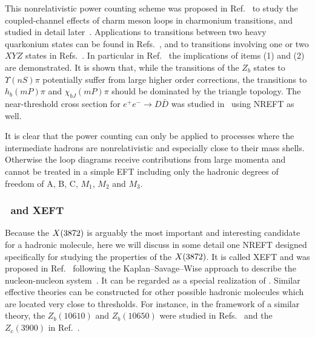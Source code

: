 This nonrelativistic power counting scheme was proposed in
Ref.~\cite{Guo:2009wr} to study the coupled-channel effects of charm meson
loops in charmonium transitions, and studied in detail later~\cite{Guo:2010ak}.
Applications to transitions between two heavy quarkonium states can be found in
Refs.~\cite{Guo:2010zk,Guo:2010ca,Guo:2011dv,Mehen:2011tp,Guo:2012tg,
Guo:2014qra}, and to transitions involving one or two $XYZ$ states in
Refs.~\cite{Cleven:2011gp,Cleven:2013sq,Guo:2013nza,
Esposito:2014hsa,Mehen:2015efa,Huo:2015uka,Wu:2016dws,Abreu:2016xlr,
Chen:2016mjn}. In particular in Ref.~\cite{Cleven:2013sq} the implications of
items (1) and (2) are demonstrated.
It is shown that, while the transitions of the $Z_b$ states to $\Upsilon(nS)\pi$
potentially suffer from large higher order corrections, the transitions to 
$h_b(mP)\pi$ and $\chi_{bJ}(mP)\pi$ should be dominated by the triangle
topology. The near-threshold cross section for $e^+e^-\to D\bar D$ was studied
in~\cite{Chen:2012qq} using NREFT as well.


It is clear that the power counting can only be applied to processes where the
intermediate hadrons are nonrelativistic and especially close to their mass
shells. Otherwise the loop diagrams receive contributions from large momenta and
cannot be treated in a simple EFT including only the hadronic degrees of freedom
of A, B, C, $M_1$, $M_2$ and $M_3$.


\subsubsection{\nreftii~and XEFT}
\label{sec:4-XEFT}

Because the $X(3872)$ is arguably the most important and interesting candidate for a
hadronic molecule, here we will discuss in some detail one NREFT
designed specifically for studying the properties of the $X(3872)$. It is called XEFT
and was proposed in Ref.~\cite{Fleming:2007rp} following the
Kaplan--Savage--Wise approach to describe the nucleon-nucleon
system~\cite{Kaplan:1998tg,Kaplan:1998we}. It can be regarded as a special
realization of \nreftii. Similar effective theories can be constructed for other
possible hadronic molecules which are located very close to thresholds. For
instance, in the framework of a similar theory, the $Z_b(10610)$ and
$Z_b(10650)$ were studied in Refs.~\cite{Mehen:2011yh,Mehen:2013mva} and the
$Z_c(3900)$ in Ref.~\cite{Wilbring:2013cha}.

